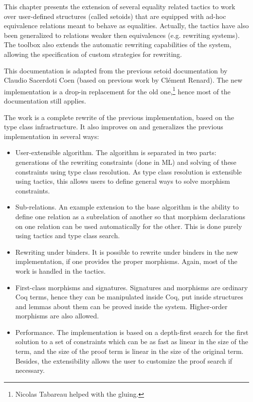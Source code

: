 \newtheorem{cscexample}{Example}

\label{setoids}

This chapter presents the extension of several equality related tactics
to work over user-defined structures (called setoids) that are equipped
with ad-hoc equivalence relations meant to behave as equalities.
Actually, the tactics have also been generalized to relations weaker
then equivalences (e.g. rewriting systems). The toolbox also extends the
automatic rewriting capabilities of the system, allowing the specification of
custom strategies for rewriting.

This documentation is adapted from the previous setoid documentation by
Claudio Sacerdoti Coen (based on previous work by Cl\'ement Renard).
The new implementation is a drop-in replacement for the old one,\footnote{Nicolas
Tabareau helped with the gluing.} hence most of the documentation still applies.

The work is a complete rewrite of the previous implementation, based on
the type class infrastructure. It also improves on and generalizes
the previous implementation in several ways:
\begin{itemize}
\item User-extensible algorithm. The algorithm is separated in two
  parts: generations of the rewriting constraints (done in ML) and
  solving of these constraints using type class resolution. As type
  class resolution is extensible using tactics, this allows users to define
  general ways to solve morphism constraints.
\item Sub-relations. An example extension to the base algorithm is the
  ability to define one relation as a subrelation of another so that
  morphism declarations on one relation can be used automatically for
  the other. This is done purely using tactics and type class search.
\item Rewriting under binders. It is possible to rewrite under binders
  in the new implementation, if one provides the proper
  morphisms. Again, most of the work is handled in the tactics.
\item First-class morphisms and signatures. Signatures and morphisms are
  ordinary Coq terms, hence they can be manipulated inside Coq, put
  inside structures and lemmas about them can be proved inside the
  system. Higher-order morphisms are also allowed.
\item Performance. The implementation is based on a depth-first search for the first
  solution to a set of constraints which can be as fast as linear in the
  size of the term, and the size of the proof term is linear
  in the size of the original term. Besides, the extensibility allows the
  user to customize the proof search if necessary.
\end{itemize}

